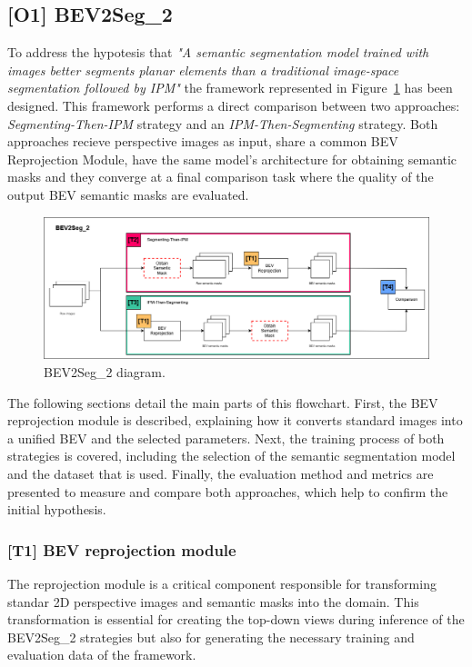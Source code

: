 \subsection{[O1] BEV2Seg\_2} \label{sec:bev2seg_2}
To address the hypotesis that \textit{"A semantic segmentation model trained with  images better segments planar elements than a traditional image-space segmentation followed by IPM"} the framework represented in Figure~\ref{fig:beg2seg_2_flow} has been designed. This framework performs a direct comparison between two approaches: \textit{Segmenting-Then-IPM} strategy and an \textit{IPM-Then-Segmenting} strategy. Both approaches recieve perspective images as input, share a common BEV Reprojection Module, have the same model's architecture for obtaining semantic masks and they converge at a final comparison task where the quality of the output BEV semantic masks are evaluated.

\begin{figure}[h!]
    \centering
    \includegraphics[width=\linewidth]{./images/methodology/BEV2Seg_2.png}
    \caption{BEV2Seg\_2 diagram.}
    \label{fig:beg2seg_2_flow}
\end{figure}

The following sections detail the main parts of this flowchart. First, the BEV reprojection module is described, explaining how it converts standard images into a unified \acl{BEV} and the selected  parameters. Next, the training process of both strategies is covered, including the selection of the semantic segmentation model and the dataset that is used. Finally, the evaluation method and metrics are presented to measure and compare both approaches, which help to confirm the initial hypothesis.

\subsubsection{[T1] BEV reprojection module} \label{sec:bev_reprojection_module}
The  reprojection module is a critical component responsible for transforming standar 2D perspective images and semantic masks into the  domain. This transformation is essential for creating the top-down views during inference of the BEV2Seg\_2 strategies but also for generating the necessary training and evaluation data of the framework.

